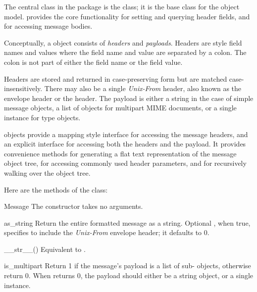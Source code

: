 
The central class in the  package is the
 class; it is the base class for the 
object model.   provides the core functionality for
setting and querying header fields, and for accessing message bodies.

Conceptually, a  object consists of \emph{headers} and
\emph{payloads}.  Headers are  style field names and
values where the field name and value are separated by a colon.  The
colon is not part of either the field name or the field value.

Headers are stored and returned in case-preserving form but are
matched case-insensitively.  There may also be a single
\emph{Unix-From} header, also known as the envelope header or the
 header.  The payload is either a string in the case of
simple message objects, a list of  objects for
multipart MIME documents, or a single  instance for
 type objects.

 objects provide a mapping style interface for
accessing the message headers, and an explicit interface for accessing
both the headers and the payload.  It provides convenience methods for
generating a flat text representation of the message object tree, for
accessing commonly used header parameters, and for recursively walking
over the object tree.

Here are the methods of the  class:

\begin{classdesc}{Message}{}
The constructor takes no arguments.
\end{classdesc}

\begin{methoddesc}[Message]{as_string}{}
Return the entire formatted message as a string.  Optional
, when true, specifies to include the \emph{Unix-From}
envelope header; it defaults to 0.
\end{methoddesc}

\begin{methoddesc}[Message]{__str__()}{}
Equivalent to .
\end{methoddesc}

\begin{methoddesc}[Message]{is_multipart}{}
Return 1 if the message's payload is a list of sub-
objects, otherwise return 0.  When  returns 0,
the payload should either be a string object, or a single
 instance.
\end{methoddesc}

